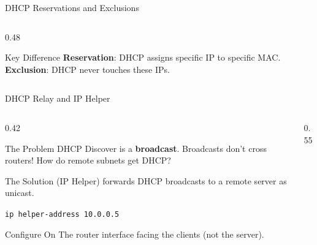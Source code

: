 \documentclass[aspectratio=169]{beamer}  %
\begin{document}
\begin{frame}{DHCP Reservations and Exclusions}
\begin{columns}[T]
\begin{column}{0.48\textwidth}
            \vspace{0.2em}
            \begin{alertblock}{Key Difference}
                \small
                \textbf{Reservation}: DHCP assigns specific IP to specific MAC. \\
                \textbf{Exclusion}: DHCP never touches these IPs.
            \end{alertblock}
        \end{column}
    \end{columns}
\end{frame}

\begin{frame}{DHCP Relay and IP Helper}
    \begin{columns}[T]
        \begin{column}{0.42\textwidth}
            \begin{block}{The Problem}
                \small
                DHCP Discover is a \textbf{broadcast}. Broadcasts don't cross routers! How do remote subnets get DHCP?
            \end{block}
            
            \vspace{0.2em}
            \begin{block}{The Solution}
                \small
                 (IP Helper) forwards DHCP broadcasts to a remote server as unicast.
                
                \vspace{0.2em}
                \texttt{ip helper-address 10.0.0.5}
            \end{block}
            
            \vspace{0.2em}
            \begin{alertblock}{Configure On}
                \small
                The router interface facing the clients (not the server).
            \end{alertblock}
        \end{column}
        \begin{column}{0.55\textwidth}
            \begin{center}
\end{center}
\end{column}
\end{columns}
\end{frame}
\end{document}
